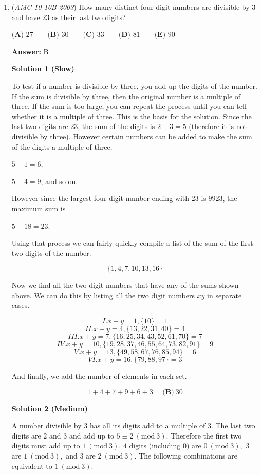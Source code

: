 \begin{enumerate}
	\item (\textit{AMC 10 10B 2003}) How many distinct four-digit numbers are divisible by $3$ and have $23$ as their last two digits?


 $\textbf{(A) } 27 \qquad\textbf{(B) } 30 \qquad\textbf{(C) } 33 \qquad\textbf{(D) } 81 \qquad\textbf{(E) } 90$

 \textbf{Answer: }B



\textbf{Solution 1 (Slow)}

To test if a number is divisible by three, you add up the digits of the number. If the sum is divisible by three, then the original number is a multiple of three. If the sum is too large, you can repeat the process until you can tell whether it is a multiple of three. This is the basis for the solution. Since the last two digits are $23$, the sum of the digits is $2+3 = 5$ (therefore it is not divisible by three). However certain numbers can be added to make the sum of the digits a multiple of three.

 $5+1 = 6$,

 $5+4 = 9$, and so on. 

 However since the largest four-digit number ending with $23$ is $9923$, the maximum sum is

 $5+18 = 23$.

 Using that process we can fairly quickly compile a list of the sum of the first two digits of the number. 

 
 \[\{1, 4, 7, 10, 13, 16\}\]

 Now we find all the two-digit numbers that have any of the sums shown above. We can do this by listing all the two digit numbers $xy$ in separate cases.

 
 \[I. x+y = 1, \{10\} = 1\]
 \[II. x+y = 4, \{13, 22, 31, 40\} = 4\]
 \[III. x+y = 7, \{16, 25, 34, 43, 52, 61, 70\} = 7\]
 \[IV. x+y = 10, \{19, 28, 37, 46, 55, 64, 73, 82, 91\} = 9\]
 \[V. x+y = 13, \{49, 58, 67, 76, 85, 94\} = 6\]
 \[VI. x+y = 16, \{79, 88, 97\} = 3\]

 And finally, we add the number of elements in each set.

 
 \[1+4+7+9+6+3 = \boxed{\textbf{(B)}\ 30}\]




\textbf{Solution 2 (Medium)}

A number divisible by $3$ has all its digits add to a multiple of $3.$ The last two digits are $2$ and $3$ and add up to $5 \equiv 2\ (\text{mod}\ 3).$ Therefore the first two digits must add up to $1\ (\text{mod}\ 3).$ $4$ digits (including $0$) are $0\ (\text{mod}\ 3),$ $3$ are $1\ (\text{mod}\ 3),$ and $3$ are $2\ (\text{mod}\ 3).$ The following combinations are equivalent to $1\ (\text{mod}\ 3)$:


\end{enumerate}
